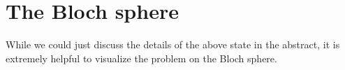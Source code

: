 \section{The Bloch sphere}

While we could just discuss the details of the above state in the abstract, it is extremely helpful to visualize the problem on the Bloch sphere. 